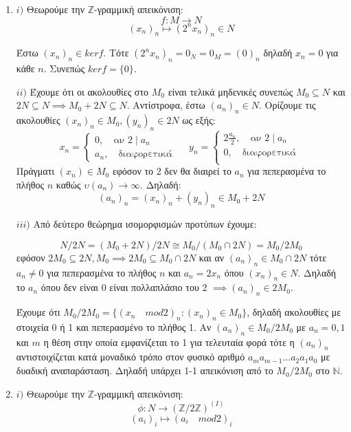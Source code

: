 \documentclass{article}
\begin{document}
\begin{enumerate}
\item $i)$ Θεωρούμε την $\mathbb{Z}$-γραμμική απεικόνιση:
	$$f: M \rightarrow N $$
	$$(x_n)_n \mapsto (2^n x_n)_n \in N$$

	Έστω $(x_n)_n \in kerf$. Τότε $(2^n x_n)_n = 0_N = 0_M = (0)_n$ δηλαδή $x_n = 0$ για κάθε $n$. Συνεπώς $kerf = \{ 0\}$.
	$ $\newline

	$ii)$ Έχουμε ότι οι ακολουθίες στο $M_0$ είναι τελικά μηδενικές συνεπώς $M_0 \subseteq N$ και $2Ν \subseteq N \implies M_0 + 2N \subseteq N$. Αντίστροφα, έστω $(a_n)_n \in N$. Ορίζουμε τις ακολουθίες $(x_n)_n \in M_0, (y_n)_n \in 2N$ ως εξής:
	\[ x_n = \begin{cases}
			0, \quad\text{αν } 2\mid a_n \\
			a_n, \quad\text{διαφορετικά }
	\end{cases} \quad y_n = \begin{cases}
	2\frac{a_n}{2}, \quad\text{αν } 2 \mid a_n\\
	0, \quad\text{διαφορετικά }\\
	\end{cases}
	\]
	Πράγματι $(x_n) \in M_0$ εφόσον το 2 δεν θα διαιρεί το $a_n$ για πεπερασμένα το πλήθος $n$ καθώς $\upsilon (a_n) \rightarrow \infty$. Δηλαδή:
	$$ (a_n)_n = (x_n)_n + (y_n)_n \in M_0 + 2N$$
	$ $\newline

	$iii)$ Από δεύτερο θεώρημα ισομορφισμών προτύπων έχουμε:

	$$N / 2N = (M_0 + 2N) / 2N \cong M_0 / (M_0 \cap 2N) = M_0 / 2M_0 $$
	εφόσον $2M_0 \subseteq 2N, M_0 \implies 2M_0 \subseteq M_0 \cap 2N$ και αν $(a_n)_n \in M_0 \cap 2N$ τότε $a_n \neq 0$ για πεπερασμένα το πλήθος $n$ και $a_n = 2 x_n$ όπου $(x_n)_n \in N$. Δηλαδή το $a_n$ όπου δεν είναι 0 είναι πολλαπλάσιο του 2 $\implies (a_n)_n \in 2M_0$.

	Έχουμε ότι $M_0 / 2M_0 = \{ (x_n \quad mod2)_n : (x_n)_n \in M_0 \}$, δηλαδή ακολουθίες με στοιχεία 0 ή 1 και πεπερασμένο το πλήθος 1. Αν $(a_n)_n \in M_0 / 2M_0$ με $a_n =0,1$ και $m$ η θέση στην οποία εμφανίζεται το 1 για τελευταία φορά τότε η $(a_n)_n$ αντιστοιχίζεται κατά μοναδικό τρόπο στον φυσικό αριθμό $a_m a_{m-1} \ldots a_2 a_1 a_0$ με δυαδική αναπαράσταση. Δηλαδή υπάρχει 1-1 απεικόνιση από το $M_0 / 2M_0$ στο $\mathbb{N}$.
	$ $\newline

\item $i)$ Θεωρούμε την $\mathbb{Z}$-γραμμική απεικόνιση:
	$$\phi : N \rightarrow (\mathbb{Z} / 2\mathbb{Z})^{(Ι)}$$
	$$(a_i)_i \mapsto (a_i \quad mod 2)_i $$


\end{enumerate}
\end{document}
